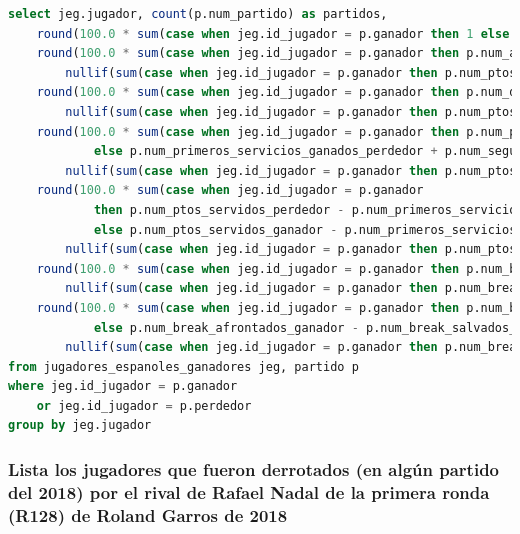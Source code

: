 \documentclass[10pt]{opticajnl}
\begin{document}
\begin{lstlisting}[language=SQL]
select jeg.jugador, count(p.num_partido) as partidos,
    round(100.0 * sum(case when jeg.id_jugador = p.ganador then 1 else 0 end) / count(p.num_partido), 1) as pcje_victorias, 
    round(100.0 * sum(case when jeg.id_jugador = p.ganador then p.num_aces_ganador else p.num_aces_perdedor end) / 
        nullif(sum(case when jeg.id_jugador = p.ganador then p.num_ptos_servidos_ganador  else p.num_ptos_servidos_perdedor end), 0), 1) as pcje_aces, 
    round(100.0 * sum(case when jeg.id_jugador = p.ganador then p.num_dob_faltas_ganador  else p.num_dob_faltas_perdedor  end) / 
        nullif(sum(case when jeg.id_jugador = p.ganador then p.num_ptos_servidos_ganador  else p.num_ptos_servidos_perdedor end), 0), 1) as pcje_dobles_faltas, 
    round(100.0 * sum(case when jeg.id_jugador = p.ganador then p.num_primeros_servicios_ganados_ganador + p.num_segundos_servicios_ganados_ganador 
            else p.num_primeros_servicios_ganados_perdedor + p.num_segundos_servicios_ganados_perdedor end) / 
        nullif(sum(case when jeg.id_jugador = p.ganador then p.num_ptos_servidos_ganador  else p.num_ptos_servidos_perdedor end), 0), 1) as pcje_servicios_ganados, 
    round(100.0 * sum(case when jeg.id_jugador = p.ganador 
            then p.num_ptos_servidos_perdedor - p.num_primeros_servicios_ganados_perdedor - p.num_segundos_servicios_ganados_perdedor 
            else p.num_ptos_servidos_ganador - p.num_primeros_servicios_ganados_ganador - p.num_segundos_servicios_ganados_ganador end) / 
        nullif(sum(case when jeg.id_jugador = p.ganador then p.num_ptos_servidos_perdedor else p.num_ptos_servidos_ganador end), 0), 1) as pcje_restos_ganados,
    round(100.0 * sum(case when jeg.id_jugador = p.ganador then p.num_break_salvados_ganador else p.num_break_salvados_perdedor end) / 
        nullif(sum(case when jeg.id_jugador = p.ganador then p.num_break_afrontados_ganador else p.num_break_afrontados_perdedor end), 0), 1) as pcje_breaks_salvados, 
    round(100.0 * sum(case when jeg.id_jugador = p.ganador then p.num_break_afrontados_perdedor - p.num_break_salvados_perdedor 
            else p.num_break_afrontados_ganador - p.num_break_salvados_ganador end) / 
        nullif(sum(case when jeg.id_jugador = p.ganador then p.num_break_afrontados_perdedor else p.num_break_afrontados_ganador end), 0), 1) as pcje_breaks_ganados
from jugadores_espanoles_ganadores jeg, partido p
where jeg.id_jugador = p.ganador 
	or jeg.id_jugador = p.perdedor
group by jeg.jugador
\end{lstlisting}

\subsubsection{Lista los jugadores que fueron derrotados (en algún partido del 2018) por el rival de Rafael Nadal de la primera ronda (R128) de Roland Garros de 2018}
\end{document}
